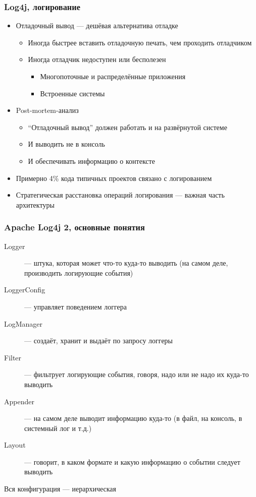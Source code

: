 \documentclass[xetex,mathserif,serif]{beamer}
\begin{document}
	\begin{frame}
		\frametitle{Log4j, логирование}
		\begin{itemize}
			\item Отладочный вывод --- дешёвая альтернатива отладке
			\begin{itemize}
				\item Иногда быстрее вставить отладочную печать, чем проходить отладчиком
				\item Иногда отладчик недоступен или бесполезен
				\begin{itemize}
					\item Многопоточные и распределённые приложения
					\item Встроенные системы
				\end{itemize}
			\end{itemize}
			\item Post-mortem-анализ
			\begin{itemize}
				\item ``Отладочный вывод'' должен работать и на развёрнутой системе
				\item И выводить не в консоль
				\item И обеспечивать информацию о контексте
			\end{itemize}
			\item Примерно 4\% кода типичных проектов связано с логированием
			\item Стратегическая расстановка операций логирования --- важная часть архитектуры
		\end{itemize}
	\end{frame}

	\begin{frame}
		\frametitle{Apache Log4j 2, основные понятия}
		\begin{description}
			\item [Logger] --- штука, которая может что-то куда-то выводить (на самом деле, производить логирующие события)
			\item [LoggerConfig] --- управляет поведением логгера
			\item [LogManager] --- создаёт, хранит и выдаёт по запросу логгеры
			\item [Filter] --- фильтрует логирующие события, говоря, надо или не надо их куда-то выводить
			\item [Appender] --- на самом деле выводит информацию куда-то (в файл, на консоль, в системный лог и т.д.)
			\item [Layout] --- говорит, в каком формате и какую информацию о событии следует выводить
		\end{description}
		\begin{center}Вся конфигурация --- иерархическая\end{center}
	\end{frame}
\end{document}
